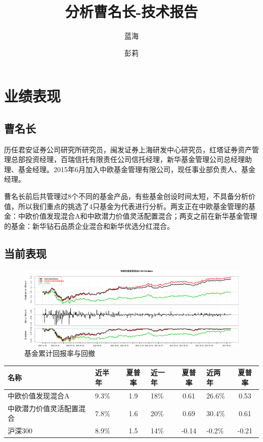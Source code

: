\documentclass[hyperref,]{ctexart}
\title{分析曹名长-技术报告}
\author{蓝海 \and 彭莉}
\date{}
\begin{document}
\maketitle

{
\setcounter{tocdepth}{2}
\tableofcontents
}
\section{业绩表现}

\subsection{曹名长}

历任君安证券公司研究所研究员，闽发证券上海研发中心研究员，红塔证券资产管理总部投资经理，百瑞信托有限责任公司信托经理，新华基金管理公司总经理助理、基金经理。2015年6月加入中欧基金管理有限公司，现任事业部负责人、基金经理。

曹名长前后共管理过8个不同的基金产品，有些基金创设时间太短，不具备分析价值，所以我们重点的挑选了4只基金为代表进行分析。两支正在中欧基金管理的基金：中欧价值发现混合A和中欧潜力价值灵活配置混合；两支之前在新华基金管理的基金：新华钻石品质企业混合和新华优选分红混合。

\subsection{当前表现}

\begin{figure}[htbp]
\centering
\includegraphics{caominchang-details_files/figure-latex/unnamed-chunk-1-1.pdf}
\caption{基金累计回报率与回撤}
\end{figure}

\begin{longtable}[]{@{}llclclc@{}}
\toprule
名称 & 近半年 & 夏普率 & 近一年 & 夏普率 & 近两年 &
夏普率\tabularnewline
\midrule
\endhead
中欧价值发现混合A & 9.3\% & 1.9 & 18\% & 0.61 & 26.6\% &
0.53\tabularnewline
中欧潜力价值灵活配置混合 & 7.8\% & 1.6 & 20\% & 0.69 & 30.4\% &
0.61\tabularnewline
沪深300 & 8.9\% & 1.5 & 14\% & -0.14 & -0.2\% & -0.21\tabularnewline
\bottomrule
\end{longtable}
\end{document}
